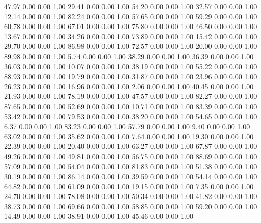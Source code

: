    47.97   0.00   0.00   1.00
   29.41   0.00   0.00   1.00
   54.20   0.00   0.00   1.00
   32.57   0.00   0.00   1.00
   12.14   0.00   0.00   1.00
   82.24   0.00   0.00   1.00
   57.65   0.00   0.00   1.00
   59.29   0.00   0.00   1.00
   60.78   0.00   0.00   1.00
   67.01   0.00   0.00   1.00
   75.80   0.00   0.00   1.00
   46.50   0.00   0.00   1.00
   13.67   0.00   0.00   1.00
   34.26   0.00   0.00   1.00
   73.89   0.00   0.00   1.00
   15.42   0.00   0.00   1.00
   29.70   0.00   0.00   1.00
   86.98   0.00   0.00   1.00
   72.57   0.00   0.00   1.00
   20.00   0.00   0.00   1.00
   89.98   0.00   0.00   1.00
    5.74   0.00   0.00   1.00
   38.29   0.00   0.00   1.00
   36.39   0.00   0.00   1.00
   36.03   0.00   0.00   1.00
   10.07   0.00   0.00   1.00
   38.19   0.00   0.00   1.00
   55.22   0.00   0.00   1.00
   88.93   0.00   0.00   1.00
   19.79   0.00   0.00   1.00
   31.87   0.00   0.00   1.00
   23.96   0.00   0.00   1.00
   26.23   0.00   0.00   1.00
   16.96   0.00   0.00   1.00
    2.06   0.00   0.00   1.00
   40.45   0.00   0.00   1.00
   21.93   0.00   0.00   1.00
   78.19   0.00   0.00   1.00
   47.57   0.00   0.00   1.00
   82.27   0.00   0.00   1.00
   87.65   0.00   0.00   1.00
   52.69   0.00   0.00   1.00
   10.71   0.00   0.00   1.00
   83.39   0.00   0.00   1.00
   53.42   0.00   0.00   1.00
   79.53   0.00   0.00   1.00
   38.20   0.00   0.00   1.00
   54.65   0.00   0.00   1.00
    6.37   0.00   0.00   1.00
   83.23   0.00   0.00   1.00
   57.79   0.00   0.00   1.00
    9.40   0.00   0.00   1.00
   63.02   0.00   0.00   1.00
   35.62   0.00   0.00   1.00
    7.64   0.00   0.00   1.00
   19.30   0.00   0.00   1.00
   22.39   0.00   0.00   1.00
   20.40   0.00   0.00   1.00
   63.27   0.00   0.00   1.00
   67.87   0.00   0.00   1.00
   49.26   0.00   0.00   1.00
   49.81   0.00   0.00   1.00
   56.75   0.00   0.00   1.00
   88.69   0.00   0.00   1.00
   57.09   0.00   0.00   1.00
   54.04   0.00   0.00   1.00
   81.83   0.00   0.00   1.00
   51.38   0.00   0.00   1.00
   30.19   0.00   0.00   1.00
   86.14   0.00   0.00   1.00
   39.59   0.00   0.00   1.00
   54.14   0.00   0.00   1.00
   64.82   0.00   0.00   1.00
   61.09   0.00   0.00   1.00
   19.15   0.00   0.00   1.00
    7.35   0.00   0.00   1.00
   24.70   0.00   0.00   1.00
   78.08   0.00   0.00   1.00
   50.34   0.00   0.00   1.00
   41.82   0.00   0.00   1.00
   38.73   0.00   0.00   1.00
   69.66   0.00   0.00   1.00
   58.85   0.00   0.00   1.00
   59.20   0.00   0.00   1.00
   14.49   0.00   0.00   1.00
   38.91   0.00   0.00   1.00
   45.46   0.00   0.00   1.00
